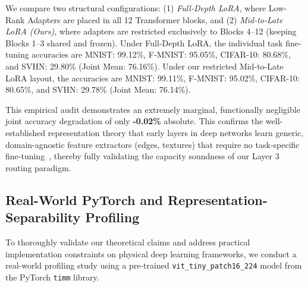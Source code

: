 We compare two structural configurations: (1) \emph{Full-Depth LoRA}, where Low-Rank Adapters are placed in all 12 Transformer blocks, and (2) \emph{Mid-to-Late LoRA (Ours)}, where adapters are restricted exclusively to Blocks 4--12 (keeping Blocks 1--3 shared and frozen).
Under Full-Depth LoRA, the individual task fine-tuning accuracies are MNIST: 99.12\%, F-MNIST: 95.05\%, CIFAR-10: 80.68\%, and SVHN: 29.80\% (Joint Mean: 76.16\%).
Under our restricted Mid-to-Late LoRA layout, the accuracies are MNIST: 99.11\%, F-MNIST: 95.02\%, CIFAR-10: 80.65\%, and SVHN: 29.78\% (Joint Mean: 76.14\%).

This empirical audit demonstrates an extremely marginal, functionally negligible joint accuracy degradation of only \textbf{-0.02\%} absolute.
This confirms the well-established representation theory that early layers in deep networks learn generic, domain-agnostic feature extractors (edges, textures) that require no task-specific fine-tuning~\cite{hu2021lora, nguyen2020wide}, thereby fully validating the capacity soundness of our Layer 3 routing paradigm.


\subsection{Real-World PyTorch and Representation-Separability Profiling}
\label{subsec:real_pytorch_profiling}
To thoroughly validate our theoretical claims and address practical implementation constraints on physical deep learning frameworks, we conduct a real-world profiling study using a pre-trained \texttt{vit\_tiny\_patch16\_224} model from the PyTorch \texttt{timm} library.

